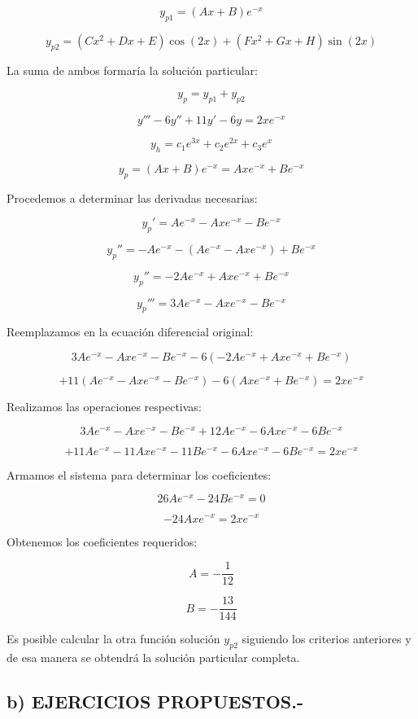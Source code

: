 \[
y_{p1} = ( Ax + B) e^{-x}
\]

\[
y_{p2} = ( Cx^2 + Dx + E) \cos(2x) + ( Fx^2 + Gx + H) \sin(2x)
\]

La suma de ambos formaría la solución particular:

\[
y_p = y_{p1} + y_{p2}
\]

\[
y''' - 6y'' + 11y' - 6y = 2x e^{-x}
\]

\[
y_h = c_1 e^{3x} + c_2 e^{2x} + c_3 e^{x}
\]

\[
y_p = ( Ax + B) e^{-x} = Ax e^{-x} + B e^{-x}
\]

Procedemos a determinar las derivadas necesarias:

\[
y_p' = A e^{-x} - A x e^{-x} - B e^{-x}
\]

\[
y_p'' = -A e^{-x} - ( A e^{-x} - A x e^{-x}) + B e^{-x}
\]

\[
y_p'' = -2A e^{-x} + A x e^{-x} + B e^{-x}
\]

\[
y_p''' = 3A e^{-x} - A x e^{-x} - B e^{-x}
\]

Reemplazamos en la ecuación diferencial original:

\[
3A e^{-x} - A x e^{-x} - B e^{-x} -6(-2A e^{-x} + A x e^{-x} + B e^{-x})
\]

\[
+11( A e^{-x} - A x e^{-x} - B e^{-x}) -6( A x e^{-x} + B e^{-x}) = 2x e^{-x}
\]

Realizamos las operaciones respectivas:

\[
3A e^{-x} - A x e^{-x} - B e^{-x} + 12A e^{-x} -6A x e^{-x} -6B e^{-x}
\]

\[
+11A e^{-x} -11A x e^{-x} -11B e^{-x} -6A x e^{-x} -6B e^{-x} = 2x e^{-x}
\]

Armamos el sistema para determinar los coeficientes:

\[
26A e^{-x} - 24B e^{-x} = 0
\]

\[
-24A x e^{-x} = 2x e^{-x}
\]

Obtenemos los coeficientes requeridos:

\[
A = -\frac{1}{12}
\]

\[
B = -\frac{13}{144}
\]

Es posible calcular la otra función solución \( y_{p2} \) siguiendo los criterios anteriores y de esa manera se obtendrá la solución particular completa.

\subsection*{b) EJERCICIOS PROPUESTOS.-}

